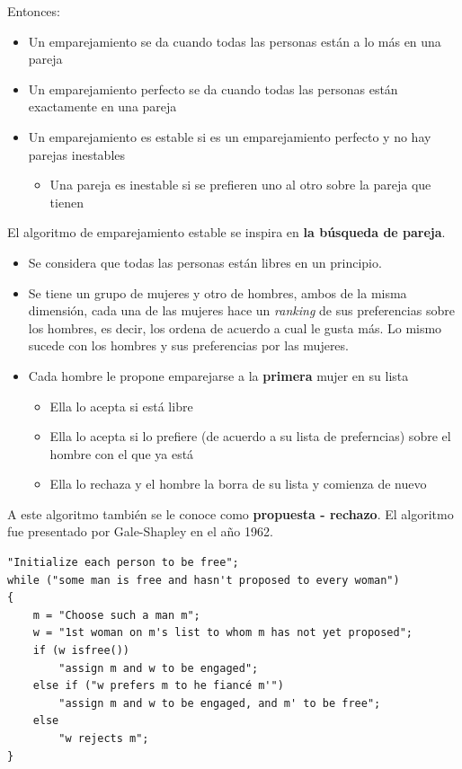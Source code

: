 \documentclass[letterpaper]{article}
\begin{document}
Entonces:
\begin{itemize}
\item Un emparejamiento se da cuando todas las personas están a lo más en una pareja
\item Un emparejamiento perfecto se da cuando todas las personas están exactamente
en una pareja
\item Un emparejamiento es estable si es un emparejamiento perfecto y no hay
parejas inestables
\begin{itemize}
\item Una pareja es inestable si se prefieren uno al otro sobre la pareja que
tienen
\end{itemize}
\end{itemize}

El algoritmo de emparejamiento estable se inspira en \textbf{la búsqueda de pareja}.
\begin{itemize}
\item Se considera que todas las personas están libres en un principio.
\item Se tiene un grupo de mujeres y otro de hombres, ambos de la misma dimensión,
cada una de las mujeres hace un \emph{ranking} de sus preferencias sobre los
hombres, es decir, los ordena de acuerdo a cual le gusta más. Lo mismo sucede
con los hombres y sus preferencias por las mujeres.
\item Cada hombre le propone emparejarse a la \textbf{primera} mujer en su lista
\begin{itemize}
\item Ella lo acepta si está libre
\item Ella lo acepta si lo prefiere (de acuerdo a su lista de preferncias) sobre
el hombre con el que ya está
\item Ella lo rechaza y el hombre la borra de su lista y comienza de nuevo
\end{itemize}
\end{itemize}
A este algoritmo también se le conoce como \textbf{propuesta - rechazo}. El algoritmo
fue presentado por Gale-Shapley en el año 1962.
\begin{verbatim}
"Initialize each person to be free";
while ("some man is free and hasn't proposed to every woman")
{
    m = "Choose such a man m";
    w = "1st woman on m's list to whom m has not yet proposed";
    if (w isfree())
        "assign m and w to be engaged";
    else if ("w prefers m to he fiancé m'")
        "assign m and w to be engaged, and m' to be free";
    else
        "w rejects m";
}
\end{verbatim}
\end{document}
